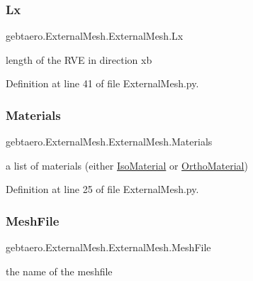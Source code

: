 \subsubsection{\texorpdfstring{Lx}{Lx}}
{\footnotesize\ttfamily gebtaero.\+External\+Mesh.\+External\+Mesh.\+Lx}



length of the R\+VE in direction xb 



Definition at line 41 of file External\+Mesh.\+py.

\mbox{\label{classgebtaero_1_1_external_mesh_1_1_external_mesh_a60dc1666f258188383bc1a172bb3d219}} 
\subsubsection{\texorpdfstring{Materials}{Materials}}
{\footnotesize\ttfamily gebtaero.\+External\+Mesh.\+External\+Mesh.\+Materials}



a list of materials (either \hyperlink{namespacegebtaero_1_1_iso_material}{Iso\+Material} or \hyperlink{namespacegebtaero_1_1_ortho_material}{Ortho\+Material}) 



Definition at line 25 of file External\+Mesh.\+py.

\mbox{\label{classgebtaero_1_1_external_mesh_1_1_external_mesh_a53b38c75b026fb6c56b50b2dd9b5270f}} 
\subsubsection{\texorpdfstring{Mesh\+File}{MeshFile}}
{\footnotesize\ttfamily gebtaero.\+External\+Mesh.\+External\+Mesh.\+Mesh\+File}



the name of the meshfile 



